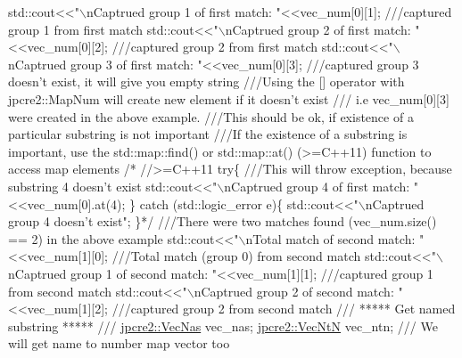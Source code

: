 \begin{DoxyCode}
\textcolor{comment}{}std::cout<<\textcolor{stringliteral}{"\(\backslash\)nCaptrued group 1 of first match: "}<<vec\_num[0][1]; \textcolor{comment}{///captured group 1 from first match }
\textcolor{comment}{}std::cout<<\textcolor{stringliteral}{"\(\backslash\)nCaptrued group 2 of first match: "}<<vec\_num[0][2]; \textcolor{comment}{///captured group 2 from first match}
\textcolor{comment}{}std::cout<<\textcolor{stringliteral}{"\(\backslash\)nCaptrued group 3 of first match: "}<<vec\_num[0][3]; \textcolor{comment}{///captured group 3 doesn't exist, it will
       give you empty string}
\textcolor{comment}{}\textcolor{comment}{///Using the [] operator with jpcre2::MapNum will create new element if it doesn't exist}
\textcolor{comment}{}\textcolor{comment}{/// i.e vec\_num[0][3] were created in the above example.}
\textcolor{comment}{}\textcolor{comment}{///This should be ok, if existence of a particular substring is not important}
\textcolor{comment}{}\textcolor{comment}{}
\textcolor{comment}{///If the existence of a substring is important, use the std::map::find() or std::map::at() (>=C++11)
       function to access map elements}
\textcolor{comment}{}\textcolor{comment}{/* //>=C++11}
\textcolor{comment}{try\{}\textcolor{comment}{}
\textcolor{comment}{    ///This will throw exception, because substring 4 doesn't exist}
\textcolor{comment}{}    std::cout<<"\(\backslash\)nCaptrued group 4 of first match: "<<vec\_num[0].at(4);
\} catch (std::logic\_error e)\{
    std::cout<<"\(\backslash\)nCaptrued group 4 doesn't exist";
\}*/
\textcolor{comment}{}
\textcolor{comment}{///There were two matches found (vec\_num.size() == 2) in the above example}
\textcolor{comment}{}std::cout<<\textcolor{stringliteral}{"\(\backslash\)nTotal match of second match: "}<<vec\_num[1][0];      \textcolor{comment}{///Total match (group 0) from second
       match}
\textcolor{comment}{}std::cout<<\textcolor{stringliteral}{"\(\backslash\)nCaptrued group 1 of second match: "}<<vec\_num[1][1]; \textcolor{comment}{///captured group 1 from second match }
\textcolor{comment}{}std::cout<<\textcolor{stringliteral}{"\(\backslash\)nCaptrued group 2 of second match: "}<<vec\_num[1][2]; \textcolor{comment}{///captured group 2 from second match}
\textcolor{comment}{}
\textcolor{comment}{}
\textcolor{comment}{/// ***** Get named substring ***** ///}
\textcolor{comment}{}
\hyperlink{namespacejpcre2_a2b121ae776ea5b2913839f418a7d856b}{jpcre2::VecNas} vec\_nas;
\hyperlink{namespacejpcre2_a88a7aaf84cad627d34c8152e726168eb}{jpcre2::VecNtN} vec\_ntn; \textcolor{comment}{/// We will get name to number map vector too}

\end{DoxyCode}
